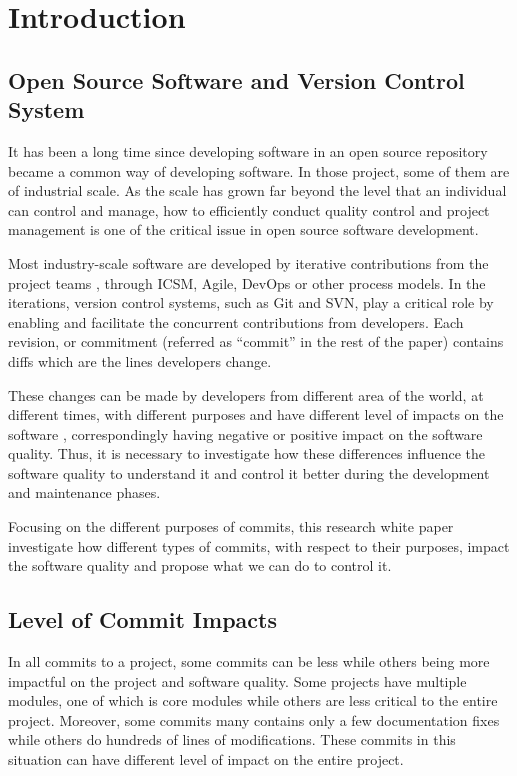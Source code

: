 \section{Introduction}
\subsection{Open Source Software and Version Control System}
It has been a long time since developing software in an open source repository became a common way of developing software. 
In those project, some of them are of industrial scale.
As the scale has grown far beyond the level that an individual can control and manage, how to efficiently conduct quality control and project management is one of the critical issue in open source software development.

Most industry-scale software are developed by iterative contributions from the project teams \cite{}, through ICSM, Agile, DevOps or other process models. 
In the iterations, version control systems, such as Git and SVN, play a critical role by enabling and facilitate the concurrent contributions from developers.
Each revision, or commitment (referred as ``commit'' in the rest of the paper) contains diffs which are the lines developers change.

These changes can be made by developers from different area of the world, at different times, with different purposes and have different level of impacts on the software \cite{qrs2020}, correspondingly having negative or positive impact on the software quality. 
Thus, it is necessary to investigate how these differences influence the software quality to understand it and control it better during the development and maintenance phases. 

Focusing on the different purposes of commits, this research white paper investigate how different types of commits, with respect to their purposes, impact the software quality and propose what we can do to control it. 

\subsection{Level of Commit Impacts}
In all commits to a project, some commits can be less while others being more impactful on the project and software quality.
Some projects have multiple modules, one of which is core modules while others are less critical to the entire project. 
Moreover, some commits many contains only a few documentation fixes while others do hundreds of lines of modifications.
These commits in this situation can have different level of impact on the entire project.

